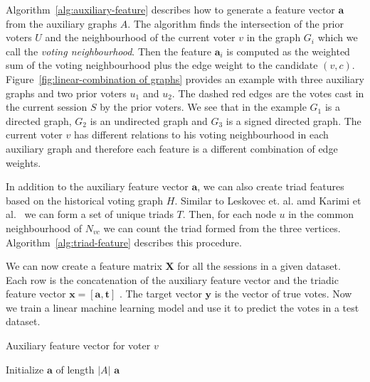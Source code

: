 Algorithm~\ref{alg:auxiliary-feature} describes how to generate a feature vector $\mathbf{a}$ from the auxiliary graphs $A$. The algorithm finds the intersection of the prior voters $U$ and the neighbourhood of the current voter $v$ in the graph $G_i$ which we call the \textit{voting neighbourhood}. Then the feature $\mathbf{a}_i$ is computed as the weighted sum of the voting neighbourhood plus the edge weight to the candidate $(v,c)$. Figure~\ref{fig:linear-combination of graphs} provides an example with three auxiliary graphs and two prior voters $u_1$ and $u_2$. The dashed red edges are the votes cast in the current session $S$ by the prior voters. We see that in the example $G_1$ is a directed graph, $G_2$ is an undirected graph and $G_3$ is a signed directed graph. The current voter $v$ has different relations to his voting neighbourhood in each auxiliary graph and therefore each feature is a different combination of edge weights. 

In addition to the auxiliary feature vector $\mathbf{a}$, we can also create triad features based on the historical voting graph $H$. Similar to Leskovec et. al. \cite{leskovec2010predicting} amd Karimi et al.\ \cite{karimi2019multicongress} we can form a set of unique triads $T$. Then, for each node $u$ in the common neighbourhood of $N_{vc}$ we can count the triad formed from the three vertices. Algorithm~\ref{alg:triad-feature} describes this procedure. 

We can now create a feature matrix $\mathbf{X}$ for all the sessions in a given dataset. Each row is the concatenation of the auxiliary feature vector and the triadic feature vector $\mathbf{x} = [\mathbf{a},\mathbf{t}]$ . The target vector $\mathbf{y}$ is the vector of true votes. Now we train a linear machine learning model and use it to predict the votes in a test dataset.

\begin{algorithm}[H]
    \DontPrintSemicolon
    \caption{Auxiliary feature vector for voter $v$ }
    \label{alg:auxiliary-feature}
    Initialize $\mathbf{a}$ of length $|A|$\;
    \Return $\mathbf{a}$
\end{algorithm}

